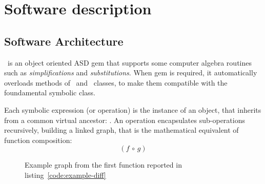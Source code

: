 
\section{Software description}
\label{sec:description}


\subsection{Software Architecture}
\label{sec:architecture}


\ragnicas~is an object oriented ASD gem that supports some computer algebra routines such as \emph{simplifications} and \emph{substitutions}. When gem is required, it automatically overloads methods of \Fixnum~and \Float~classes, to make them compatible with the foundamental symbolic class.

Each symbolic expression (or operation) is the instance of an object, that inherits from a common virtual ancestor: \CASOp. An operation encapsulates sub-operations recursively, building a linked graph, that is the mathematical equivalent of function composition:
\begin{equation}
\left( f \, \circ \, g \right)
\end{equation}

\begin{figure}[ht!]
\label{fig:graph}
\centering

\caption{Example graph from the first function reported in listing~\ref{code:example-diff}}
\end{figure}

